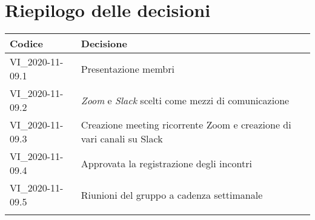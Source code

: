 \section{Riepilogo delle decisioni \hfil}
{
	\setlength{\freewidth}{\dimexpr\textwidth-4\tabcolsep}
	\renewcommand{\arraystretch}{1.5}
	\setlength{\aboverulesep}{0pt}
	\setlength{\belowrulesep}{0pt}
	\begin{longtable}{L{.3\freewidth} L{.7\freewidth}}
		\toprule 
		\textbf{Codice} & \textbf{Decisione}\\
		\toprule
		\endhead
		
		VI\_2020-11-09.1 & Presentazione membri \\  
		VI\_2020-11-09.2 & \textit{Zoom} e \textit{Slack} scelti come mezzi di comunicazione \\ 
		VI\_2020-11-09.3 & Creazione meeting ricorrente Zoom e creazione di vari canali su Slack \\
		VI\_2020-11-09.4 & Approvata la registrazione degli incontri \\  
		VI\_2020-11-09.5 & Riunioni del gruppo a cadenza settimanale \\
		
		
		\bottomrule
		\hiderowcolors
	\end{longtable}
}
